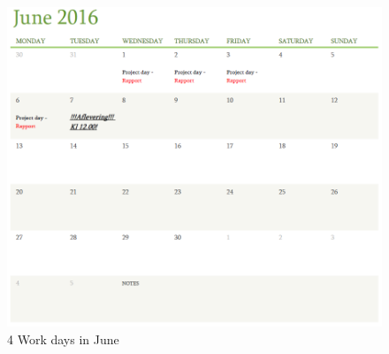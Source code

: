 \begin{figure}[h!]
  \centering
  \includegraphics[width=1.1\textwidth]{figures/June.png}
  
  \caption{4 Work days in June}
  \label{Time schedule June}
\end{figure}